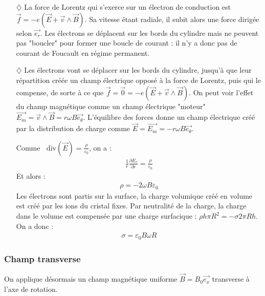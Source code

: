 \documentclass{report}
\newcommand*\diver{\mathop{}\!\mathrm{div}}
\begin{document}
\begin{itemize}

	\item[$\diamondsuit$] La force de Lorentz qui s'exerce sur un électron de conduction est $\vec{f}=-e(\vec{E}+\vec{v}\wedge\vec{B})$. Sa vitesse étant radiale, il subit alors une force dirigée selon $\vec{e_r}$. Les électrons se déplacent sur les bords du cylindre mais ne peuvent pas "boucler" pour former une boucle de courant : il n'y a donc pas de courant de Foucault en régime permanent.
	
	\item[$\diamondsuit$] Les électrons vont se déplacer sur les bords du cylindre, jusqu'à que leur répartition créée un champ électrique opposé à la force de Lorentz, puis qui le compense, de sorte à ce que $\vec{f}=\vec{0}=-e(\vec{E}+\vec{v}\wedge\vec{B})$. On peut voir l'effet du champ magnétique comme un champ électrique "moteur" $\vec{E_m}=\vec{v}\wedge\vec{B}=r\omega B\vec{e_\theta}$. L'équilibre des forces donne un champ électrique créé par la distribution de charge comme $\vec{E}=\vec{E_m}=-r\omega B\vec{e_\theta}$.
	
	Comme $\diver(\vec{E})=\frac{\rho}{\varepsilon_0}$, on a :
	\begin{align*}
		\frac{1}{r}\frac{\partial E_r}{\partial r} 	= \frac{\rho}{\varepsilon_0}
	\end{align*}
	Et alors :
	\begin{align*}
		\rho = -2\omega B\varepsilon_0
	\end{align*}
	Les électrons sont partis sur la surface, la charge volumique créé en volume est créé par les ions du cristal fixes. Par neutralité de la charge, la charge dans le volume est compensée par une charge surfacique : $\rho h\pi R^2=-\sigma 2\pi Rh$. On a donc :
	\begin{align*}
		\sigma = \varepsilon_0 B\omega R
	\end{align*}
 
\end{itemize}

\subsubsection*{Champ transverse}	
	
	On applique désormais un champ magnétique uniforme $\vec{B}=B_{0}\vec{e_{x}}$ transverse à l'axe de rotation.
	
\end{document}
